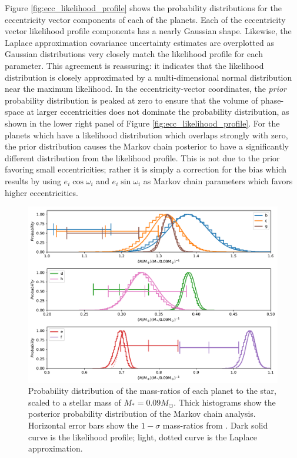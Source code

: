 \documentclass[fleqn,usenatbib]{mnras} %
\begin{document}
Figure \ref{fig:ecc_likelihood_profile} shows the probability distributions
for the eccentricity vector components of each of the planets.
Each of the eccentricity vector likelihood profile components 
has a nearly Gaussian
shape.  Likewise, the Laplace approximation covariance uncertainty estimates are overplotted as
Gaussian distributions very closely match the likelihood profile
for each parameter.  This agreement is reassuring:  it indicates
that the likelihood distribution is closely approximated by
a multi-dimensional normal distribution near the maximum likelihood.   
In the eccentricity-vector coordinates,
the {\it prior} probability distribution is peaked
at zero to ensure that the volume of phase-space at larger
eccentricities does not dominate the probability distribution,
as shown in the lower right panel of Figure \ref{fig:ecc_likelihood_profile}.  
For the planets which have
a likelihood distribution which overlaps strongly with zero,
the prior distribution causes the Markov chain posterior to
have a significantly different distribution from the likelihood profile.  This is not
due to the prior favoring small eccentricities;  rather it is simply
a correction for the bias which results by using $e_i\cos{\omega_i}$
and $e_i\sin{\omega_i}$ as Markov chain parameters which favors
higher eccentricities. 

\begin{figure}
    \centering
    \includegraphics[width=\hsize]{figures/T1_masses_03312020.pdf}
    \caption{Probability distribution of the mass-ratios of each planet to the star, scaled to a stellar mass of $M_*  = 0.09 M_\odot$.   Thick
    histograms show the posterior probability distribution of the Markov chain analysis.
    Horizontal error bars show the $1-\sigma$ mass-ratios from \citet{Grimm2018}.
    Dark solid curve is the likelihood profile; light, dotted curve is the Laplace approximation.}
    \label{fig:mass_likelihood_profile}
\end{figure}
\end{document}
